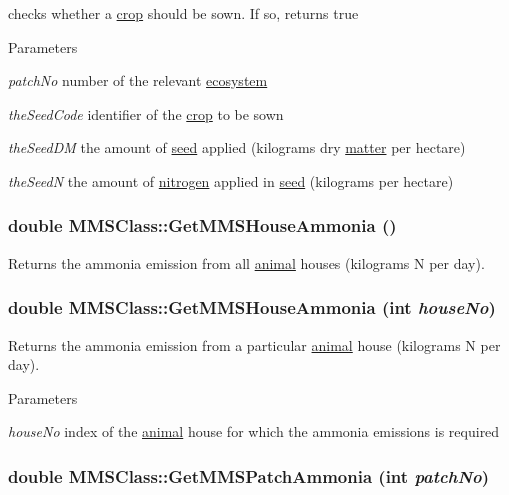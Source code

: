 checks whether a \hyperlink{classcrop}{crop} should be sown. If so, returns true 
\begin{DoxyParams}{Parameters}
\item[{\em patchNo}]number of the relevant \hyperlink{classecosystem}{ecosystem} \item[{\em theSeedCode}]identifier of the \hyperlink{classcrop}{crop} to be sown \item[{\em theSeedDM}]the amount of \hyperlink{classseed}{seed} applied (kilograms dry \hyperlink{classmatter}{matter} per hectare) \item[{\em theSeedN}]the amount of \hyperlink{classnitrogen}{nitrogen} applied in \hyperlink{classseed}{seed} (kilograms per hectare) \end{DoxyParams}
\hypertarget{class_m_m_s_class_aef61b9a68eb4cc9df284b162516b282a}{
\subsubsection[{GetMMSHouseAmmonia}]{\setlength{\rightskip}{0pt plus 5cm}double MMSClass::GetMMSHouseAmmonia ()}}
\label{class_m_m_s_class_aef61b9a68eb4cc9df284b162516b282a}


Returns the ammonia emission from all \hyperlink{classanimal}{animal} houses (kilograms N per day). \hypertarget{class_m_m_s_class_ab77575e35a1fcd15b454f96287cfbc4d}{
\subsubsection[{GetMMSHouseAmmonia}]{\setlength{\rightskip}{0pt plus 5cm}double MMSClass::GetMMSHouseAmmonia (int {\em houseNo})}}
\label{class_m_m_s_class_ab77575e35a1fcd15b454f96287cfbc4d}


Returns the ammonia emission from a particular \hyperlink{classanimal}{animal} house (kilograms N per day). 
\begin{DoxyParams}{Parameters}
\item[{\em houseNo}]index of the \hyperlink{classanimal}{animal} house for which the ammonia emissions is required \end{DoxyParams}
\hypertarget{class_m_m_s_class_a8e68d4735ebf3127f1efa6fec7d6c6c9}{
\subsubsection[{GetMMSPatchAmmonia}]{\setlength{\rightskip}{0pt plus 5cm}double MMSClass::GetMMSPatchAmmonia (int {\em patchNo})}}
\label{class_m_m_s_class_a8e68d4735ebf3127f1efa6fec7d6c6c9}


